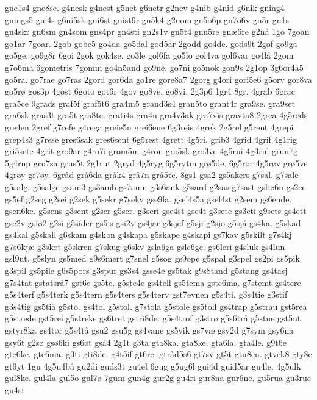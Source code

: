 gne1s4
gne8se.
g4nesk
g4nest
g5net
g6netr
g2nev
g4nib
g4nid
g6nik
gning4
gnings5
gni4s
g6ni5sk
gni6st
gnist9r
gn5k4
g2nom
gn5o6p
gn7o6v
gn5r
gn1s
gn4skr
gn6sm
gn4som
gns4pr
gn4sti
gn2s1v
gn5t4
gnu5re
gn^^e66re
g2n^^e5
1go
7goan
go1ar
7goar.
2gob
gobe5
go4da
go5dal
god5ar
2godd
go4de.
gods9t
2gof
go9ga
go5ge.
go9g8r
6goi
2gok
gok4se.
go3le
gol6fa
go5lo
gol4va
gol6var
go4l^^e5
2gom
g7o6ma
6gometris
7gomm
go4n5and
go9ne.
go7ni
go5nok
gon9s
2g1op
3g6or4a5
go5ra.
go7rae
go7ras
2gord
gor6da
go1re
gore8a7
2gorg
g4ori
gori5e6
g5orv
gor8va
go5r^^f8
gos3p
4gost
6goto
got6r
4gov
go8ve.
go8vi.
2g3p6
1gr4
8gr.
4grab
6grac
gra5ce
9grads
graf5f
graf5t6
gra4m5
grand3s4
gran5to
grant4r
gra9se.
gra9set
gra6sk
gras3t
gra5t
gra8te.
grati4s
gra4u
gra4v3ak
gra7vis
gravta8
2grea
4g5reds
gre4en
2gref
g7refe
g4rega
greie5n
grei6ene
6g3reis
4grek
2g5rel
g5rent
4grepi
grep4s3
g7rese
gres6sak
gres6sent
6g5rest
4grett
4g5ri.
grib3
4grid
4grif
4g1rig
gri5sete
4grit
gro9ar
g4ro7i
grom5m
g4ron
gro5sk
gro3ve
4g5rui
4g3rul
grun7g
5g4rup
gru7sa
grus5t
2g1rut
2gryd
4g5ryg
6g5rytm
gr^^f85de.
6g5r^^f8r
4g5r^^f8v
gr^^f85ve
4gr^^f8y
gr7^^f8y.
6gr^^e5d
gr^^e56da
gr^^e5k4
gr^^e57n
gr^^e55te.
8gs1
gsa2
gs5akers
g7sal.
g7sale
g5salg.
g5salge
gsam3
gs3amb
gs7amn
g3s6ank
g5sard
g2sas
g7sast
gsb^^f86n
gs2ce
gs5ef
g2seg
g2sei
g2sek
g5sekr
g7sekv
gse9la.
gsel4s5a
gsel4st
g2sem
gs6ende.
gsen6ke.
g5sens
g3sent
g2ser
g5ser.
g3seri
gse4st
gse4t
g3sete
gs3eti
g9sets
gs4ett
gse2v
gsf^^f82
g2si
g5sider
gs5is
gsi2v
gs4jar
g3sjef
g5sji
g2sjo
g5sj^^e5
gs4ka.
g5skad
gs4kal
g5skall
g6skam
g4skan
g4skapa
g5skape
g4skapi
gs7kav
g5skilt
g7s4kj
g7s6kj^^e6
g3skot
g5skren
g7skug
g6skv
gsla6ga
gsle6ge.
gs6leri
g4sluk
gs4lun
gsl9ut.
g5slyn
gs5med
g9s6mert
g7snel
g5sog
gs9ope
g5spal
g3spel
gs2pi
gs5pik
g3spil
gs5pile
g6s5pors
g3spur
gs3s4
gsse4e
gs5tak
g9s8tand
g5stang
gs4tasj
g7s4tat
gstatsr^^e57
gst6e
gs5te.
g5ste4e
gs4tell
gs5tema
gste6ma.
g7stemt
gs4tere
g5s4terf
g5s4terk
g5s4tern
g5s4ters
g5s4terv
gst7evnen
g5s4ti.
g3s4tie
g3stif
g3s4tig
gs5ti^^e5
g5sto.
gs4tol
g5stol.
g7stola
g5stole
gs5toll
gs4trap
g5strau
gst5rea
g5strede
gst5rei
g5streke
gs6tret
gstri8de.
g5s4trof
g3str^^f8
g5s6tr^^e5
g5stue
gst5ut
gstyr8ka
gs4t^^f8r
g5s4t^^e5
gsu2
gsu5g
gs4vane
gs5vik
gs7v^^e6
gsy2d
g7sym
gsy6na
gsy6t
g2s^^f8
gs^^f86ki
gs6^^f8t
gs^^e54
2g1t
g3ta
gta8ka.
gta8ke.
gta6la.
gta4le.
g9t6e
gte6ke.
gte6ma.
g3ti
gti8de.
g4t5if
gt6re.
gtr^^e5d5s6
gt7sv
gt5t
gtu8en.
gtvek8
gty8e
gt9yt
1gu
4g5u4b^^e5
gu2di
guds3t
gu4el
6gug
g5ug6l
gui4d
guid5ar
gu4le.
4g5ulk
gul8ke.
gul4la
gul5o
gul7^^f8
7gum
gun4g
gur2g
gu4ri
gur8na
gur6ne.
gu5rua
gu3rue
gu4st
